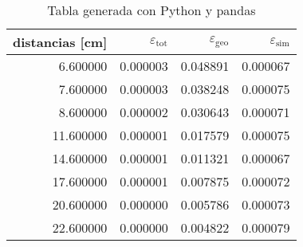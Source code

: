 \begin{table}
\caption{Tabla generada con Python y pandas}
\label{tab:datos}
\begin{tabular}{rrrr}
\toprule
distancias [cm] & $\varepsilon_{\text{tot}}$ & $\varepsilon_{\text{geo}}$ & $\varepsilon_{\text{sim}}$ \\
\midrule
6.600000 & 0.000003 & 0.048891 & 0.000067 \\
7.600000 & 0.000003 & 0.038248 & 0.000075 \\
8.600000 & 0.000002 & 0.030643 & 0.000071 \\
11.600000 & 0.000001 & 0.017579 & 0.000075 \\
14.600000 & 0.000001 & 0.011321 & 0.000067 \\
17.600000 & 0.000001 & 0.007875 & 0.000072 \\
20.600000 & 0.000000 & 0.005786 & 0.000073 \\
22.600000 & 0.000000 & 0.004822 & 0.000079 \\
\bottomrule
\end{tabular}
\end{table}

